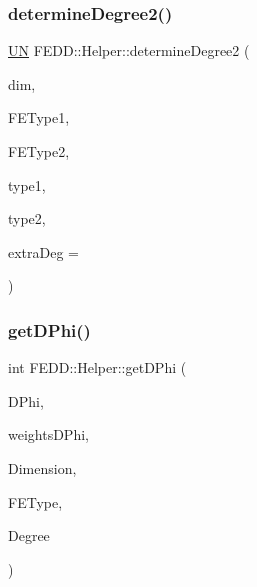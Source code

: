 \subsubsection{\texorpdfstring{determine\+Degree2()}{determineDegree2()}}
{\footnotesize\ttfamily \hyperlink{fe__test__laplace_8cpp_a223307b878979b01e3ac887d91865ab5}{UN} F\+E\+D\+D\+::\+Helper\+::determine\+Degree2 (\begin{DoxyParamCaption}\item[{\hyperlink{fe__test__laplace_8cpp_a223307b878979b01e3ac887d91865ab5}{UN}}]{dim,  }\item[{std\+::string}]{F\+E\+Type1,  }\item[{std\+::string}]{F\+E\+Type2,  }\item[{\hyperlink{classFEDD_1_1Helper_a9cb6017aaedca354e0402b8ff3b70844}{Var\+Type}}]{type1,  }\item[{\hyperlink{classFEDD_1_1Helper_a9cb6017aaedca354e0402b8ff3b70844}{Var\+Type}}]{type2,  }\item[{\hyperlink{fe__test__laplace_8cpp_a223307b878979b01e3ac887d91865ab5}{UN}}]{extra\+Deg = {} }\end{DoxyParamCaption})\hspace{0.3cm}{\ttfamily [static]}}

\mbox{\label{classFEDD_1_1Helper_aec6f9bc4208c7ce02f2bebad7a98e7d1}} 
\subsubsection{\texorpdfstring{get\+D\+Phi()}{getDPhi()}}
{\footnotesize\ttfamily int F\+E\+D\+D\+::\+Helper\+::get\+D\+Phi (\begin{DoxyParamCaption}\item[{vec3\+D\+\_\+dbl\+\_\+ptr\+\_\+\+Type \&}]{D\+Phi,  }\item[{vec\+\_\+dbl\+\_\+ptr\+\_\+\+Type \&}]{weights\+D\+Phi,  }\item[{int}]{Dimension,  }\item[{std\+::string}]{F\+E\+Type,  }\item[{int}]{Degree }\end{DoxyParamCaption})\hspace{0.3cm}{\ttfamily [static]}}

\mbox{\label{classFEDD_1_1Helper_ac15451b565dee93fa08b63c7a2957480}} 
